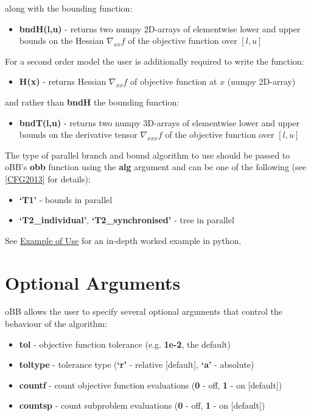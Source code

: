 \documentclass[letterpaper,11pt,openany,oneside]{sphinxmanual}
\begin{document}
along with the bounding function:
\begin{itemize}
\item {} 
\textbf{bndH(l,u)} - returns two numpy 2D-arrays of elementwise lower and upper bounds on the Hessian $\nabla_{xx} f$ of the objective function over $[l,u]$

\end{itemize}

For a second order model the user is additionally required to write the function:
\begin{itemize}
\item {} 
\textbf{H(x)} - returns Hessian $\nabla_{xx} f$ of objective function at $x$ (numpy 2D-array)

\end{itemize}

and rather than \textbf{bndH} the bounding function:
\begin{itemize}
\item {} 
\textbf{bndT(l,u)} - returns two numpy 3D-arrays of elementwise lower and upper bounds on the derivative tensor $\nabla_{xxx} f$ of the objective function over $[l,u]$

\end{itemize}

The type of parallel branch and bound algorithm to use should be passed to oBB's \textbf{obb} function using the \textbf{alg} argument and can be one of the following (see {\hyperref[userguide:cfg2013]{{[}CFG2013{]}}} for details):
\begin{itemize}
\item {} 
\textbf{`T1'} - bounds in parallel

\item {} 
\textbf{`T2\_individual'}, \textbf{`T2\_synchronised'} - tree in parallel

\end{itemize}

See {\hyperref[userguide:example-of-use]{Example of Use}} for an in-depth worked example in python.


\section{Optional Arguments}
\label{userguide:optional-arguments}
oBB allows the user to specify several optional arguments that control the behaviour of the algorithm:
\begin{itemize}
\item {} 
\textbf{tol} - objective function tolerance (e.g. \textbf{1e-2}, the default)

\item {} 
\textbf{toltype} - tolerance type (\textbf{`r'} - relative {[}default{]}, \textbf{`a'} - absolute)

\item {} 
\textbf{countf} - count objective function evaluations (\textbf{0} - off, \textbf{1} - on {[}default{]})

\item {} 
\textbf{countsp} - count subproblem evaluations (\textbf{0} - off, \textbf{1} - on {[}default{]})

\end{itemize}
\end{document}
